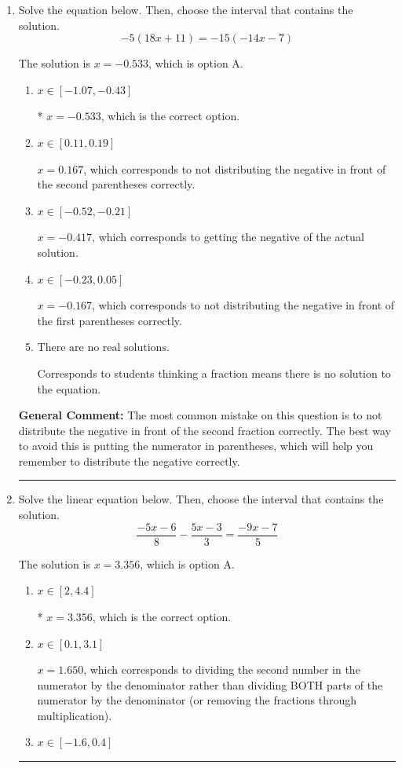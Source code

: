 \documentclass{extbook}[14pt]
\newcommand{\litem}[1]{\item #1

\rule{\textwidth}{0.4pt}}
\begin{document}
\begin{enumerate}\litem{
Solve the equation below. Then, choose the interval that contains the solution.
\[ -5(18x + 11) = -15(-14x -7) \]

The solution is \( x = -0.533 \), which is option A.\begin{enumerate}[label=\Alph*.]
\item \( x \in [-1.07, -0.43] \)

* $x = -0.533$, which is the correct option.
\item \( x \in [0.11, 0.19] \)

$x = 0.167$, which corresponds to not distributing the negative in front of the second parentheses correctly.
\item \( x \in [-0.52, -0.21] \)

$x = -0.417$, which corresponds to getting the negative of the actual solution.
\item \( x \in [-0.23, 0.05] \)

$x = -0.167$, which corresponds to not distributing the negative in front of the first parentheses correctly.
\item \( \text{There are no real solutions.} \)

Corresponds to students thinking a fraction means there is no solution to the equation.
\end{enumerate}

\textbf{General Comment:} The most common mistake on this question is to not distribute the negative in front of the second fraction correctly. The best way to avoid this is putting the numerator in parentheses, which will help you remember to distribute the negative correctly.
}
\litem{
Solve the linear equation below. Then, choose the interval that contains the solution.
\[ \frac{-5x -6}{8} - \frac{5x -3}{3} = \frac{-9x -7}{5} \]

The solution is \( x = 3.356 \), which is option A.\begin{enumerate}[label=\Alph*.]
\item \( x \in [2, 4.4] \)

* $x = 3.356$, which is the correct option.
\item \( x \in [0.1, 3.1] \)

 $x = 1.650$, which corresponds to dividing the second number in the numerator by the denominator rather than dividing BOTH parts of the numerator by the denominator (or removing the fractions through multiplication).
\item \( x \in [-1.6, 0.4] \)


\end{enumerate}}
\end{enumerate}
\end{document}
